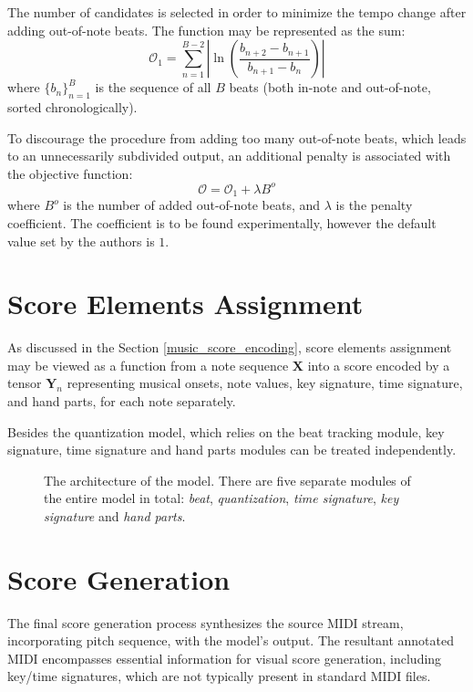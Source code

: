 The number of candidates is selected in order to minimize the tempo change after adding out-of-note beats. The function may be represented as the sum: \[\mathcal{O}_1 = \sum_{n=1}^{B-2}\left|\ln\left(\frac{b_{n+2} - b_{n+1}}{b_{n+1} - b_n}\right)\right|\] where $\{b_n\}_{n=1}^B$ is the sequence of all $B$ beats (both in-note and out-of-note, sorted chronologically).

To discourage the procedure from adding too many out-of-note beats, which leads to an unnecessarily subdivided output, an additional penalty is associated with the objective function: \begin{equation}\label{out_of_note_objective}
\mathcal{O} = \mathcal{O}_1 + \lambda B^o
\end{equation} where $B^o$ is the number of added out-of-note beats, and $\lambda$ is the penalty coefficient. The coefficient is to be found experimentally, however the default value set by the authors is $1$.



\section{Score Elements Assignment}

As discussed in the Section \ref{music_score_encoding}, score elements assignment may be viewed as a function from a note sequence $\mathbf{X}$ into a score encoded by a tensor $\mathbf{Y}_n$ representing musical onsets, note values, key signature, time signature, and hand parts, for each note separately.

Besides the quantization model, which relies on the beat tracking module, key signature, time signature and hand parts modules can be treated independently.

\begin{figure}[!ht]
\centering

\caption[The architecture of the model.]{The architecture of the model. There are five separate modules of the entire model in total: \emph{beat}, \emph{quantization}, \emph{time signature}, \emph{key signature} and \emph{hand parts}.}
\end{figure}

\section{Score Generation}

The final score generation process synthesizes the source MIDI stream, incorporating pitch sequence, with the model's output. The resultant annotated MIDI encompasses essential information for visual score generation, including key/time signatures, which are not typically present in standard MIDI files.

